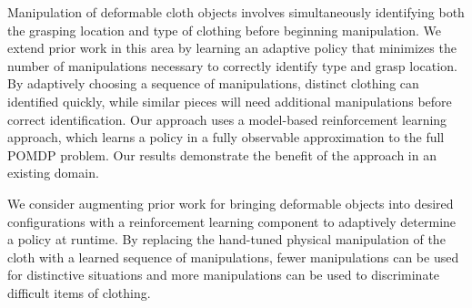 Manipulation of deformable cloth objects involves simultaneously
identifying both the grasping location and type of clothing before
beginning manipulation. We extend prior work in this area by learning
an adaptive policy that minimizes the number of manipulations
necessary to correctly identify type and grasp location. By adaptively
choosing a sequence of manipulations, distinct clothing can identified
quickly, while similar pieces will need additional manipulations
before correct identification. Our approach uses a model-based
reinforcement learning approach, which learns a policy in a fully
observable approximation to the full POMDP problem. Our results
demonstrate the benefit of the approach in an existing domain.


We consider augmenting prior work for bringing deformable objects into
desired configurations with a reinforcement learning component to
adaptively determine a policy at runtime. By replacing the hand-tuned
physical manipulation of the cloth with a learned sequence of
manipulations, fewer manipulations can be used for distinctive
situations and more manipulations can be used to discriminate
difficult items of clothing.
